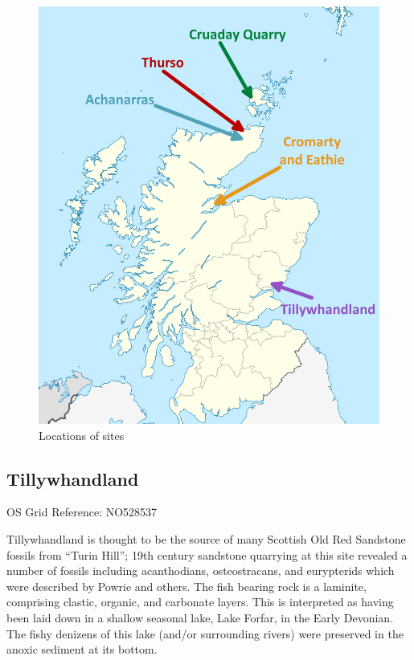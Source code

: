 \documentclass[12pt,letterpaper]{article}
\begin{document}
\begin{figure}[h!]
\caption{Locations of sites}
\includegraphics[scale=0.2]{Scotland_sites}
\centering
\end{figure}

\pagebreak

\subsection{Tillywhandland}

OS Grid Reference: NO528537

Tillywhandland is thought to be the source of many Scottish Old Red Sandstone fossils from ``Turin Hill''; 19th century sandstone quarrying at this site revealed a number of fossils including acanthodians, osteostracans, and eurypterids which were described by Powrie and others.  The fish bearing rock is a laminite, comprising clastic, organic, and carbonate layers.  This is interpreted as having been laid down in a shallow seasonal lake, Lake Forfar, in the Early Devonian.  The fishy denizens of this lake (and/or surrounding rivers) were preserved in the anoxic sediment at its bottom.\newline
\end{document}
